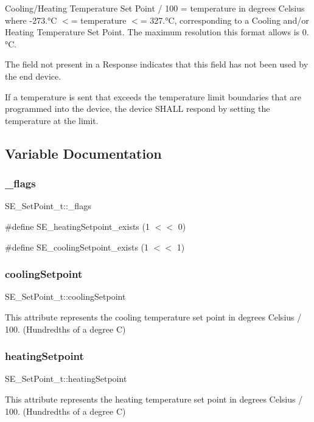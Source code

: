 Cooling/\+Heating Temperature Set Point / 100 = temperature in degrees Celsius where -\/273.°C $<$= temperature $<$= 327.°C, corresponding to a Cooling and/or Heating Temperature Set Point. The maximum resolution this format allows is 0.°C.

The field not present in a Response indicates that this field has not been used by the end device.

If a temperature is sent that exceeds the temperature limit boundaries that are programmed into the device, the device S\+H\+A\+LL respond by setting the temperature at the limit. 

\subsection{Variable Documentation}
\mbox{\label{group__SetPoint_ga360f6a67726d6468bd638a32b65a0a1d}} 
\subsubsection{\texorpdfstring{\+\_\+flags}{\_flags}}
{\footnotesize\ttfamily S\+E\+\_\+\+Set\+Point\+\_\+t\+::\+\_\+flags}

\#define S\+E\+\_\+heating\+Setpoint\+\_\+exists (1 $<$$<$ 0)

\#define S\+E\+\_\+cooling\+Setpoint\+\_\+exists (1 $<$$<$ 1) \mbox{\label{group__SetPoint_gadc4572d576c1de2dd7de8357024e4029}} 
\subsubsection{\texorpdfstring{cooling\+Setpoint}{coolingSetpoint}}
{\footnotesize\ttfamily S\+E\+\_\+\+Set\+Point\+\_\+t\+::cooling\+Setpoint}

This attribute represents the cooling temperature set point in degrees Celsius / 100. (Hundredths of a degree C) \mbox{\label{group__SetPoint_ga961578027f149085d46eb9fd1ddb4956}} 
\subsubsection{\texorpdfstring{heating\+Setpoint}{heatingSetpoint}}
{\footnotesize\ttfamily S\+E\+\_\+\+Set\+Point\+\_\+t\+::heating\+Setpoint}

This attribute represents the heating temperature set point in degrees Celsius / 100. (Hundredths of a degree C) 